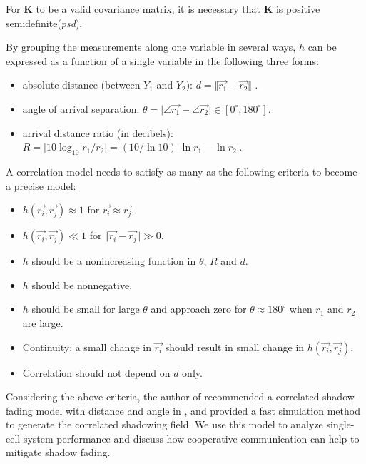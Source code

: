 For $\mathbf{K}$ to be a valid covariance matrix, it is necessary that $\mathbf{K}$ is positive semidefinite(\emph{psd}).
\par By grouping the measurements along one variable in several ways, $h$ can be expressed as a function of a single variable in the following three forms:
\begin{itemize}
\item absolute distance (between $Y_{1}$ and $Y_{2}$): $d = \Vert \vec{r_{1}}- \vec{r_{2}}\Vert$ .
\item angle of arrival separation: $\theta = \vert\angle\vec{r_{1}}-\angle\vec{r_{2}}\vert\in [0^\circ, 180^\circ]$. 
\item arrival distance ratio (in decibels): $R=\vert10\log_{10}r_{1}/r_{2}\vert=(10/\ln 10)\vert \ln r_{1}-\ln r_{2}\vert$.
\end{itemize}
A correlation model needs to satisfy as many as the following criteria to become a precise model:
\begin{itemize}
\item $h(\vec{r_{i}}, \vec{r_{j}}) \approx 1$ for $\vec{r_{i}}\approx \vec{r_{j}}$.
\item $h(\vec{r_{i}}, \vec{r_{j}}) \ll 1$ for $\Vert \vec{r_{i}}- \vec{r_{j}}\Vert\gg0$.
\item $h$ should be a nonincreasing function in $\theta$, $R$ and $d$.
\item $h$ should be nonnegative.
\item $h$ should be small for large $\theta$ and approach zero for $\theta\approx180^\circ$ when $r_{1}$ and $r_{2}$ are large.
\item Continuity: a small change in $\vec{r_{i}}$ should result in small change in $h(\vec{r_{i}}, \vec{r_{j}})$.
\item Correlation should not depend on $d$ only.
\end{itemize}
Considering the above criteria, the author of \cite{szyszkowicz2010feasibility} recommended a correlated shadow fading model with distance and angle in \cite{szyszkowicz2011interference}, and provided a fast simulation method to generate the correlated shadowing field. We use this model to analyze single-cell system performance and discuss how cooperative communication can help to mitigate shadow fading. 

